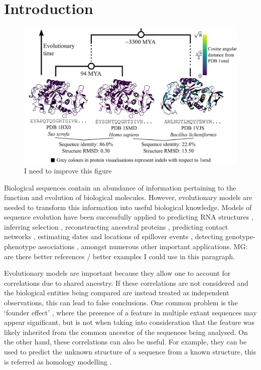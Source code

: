 \documentclass[nogrid]{MBE}%
\newcommand{\revcom}[1]{{\color{orange} #1}}
\begin{document}
\section{Introduction}
\begin{figure}
	\centering
	\includegraphics[width=1.75\columnwidth]{figures/divergence.pdf}
	\caption{\revcom{I need to improve this figure}}%
	\label{fig:divergence}%
\end{figure}

Biological sequences contain an abundance of information pertaining to the function and evolution of biological molecules. However, evolutionary models are needed to transform this information into useful biological knowledge. Models of sequence evolution have been successfully applied to predicting RNA structures \citep{sukosd2012ppfold}, inferring selection \citep{murrell2013fubar}, reconstructing ancestral proteins \citep{wilson2015using}, predicting contact networks \citep{giardina2017inference}, estimating dates and locations of spillover events \citep{dudas2018mers}, detecting genotype-phenotype associations \citep{escalera2018parallel}, amongst numerous other important applications. \revcom{MG: are there better references / better examples I could use in this paragraph}.

Evolutionary models are important because they allow one to account for correlations due to shared ancestry. If these correlations are not considered and the biological entities being compared are instead treated as independent observations, this can lead to false conclusions. One common problem is the `founder effect' \citep{bhattacharya2007founder}, where the presence of a feature in multiple extant sequences may appear significant, but is not when taking into consideration that the feature was likely inherited from the common ancestor of the sequences being analysed. On the other hand, these correlations can also be useful. For example, they can be used to predict the unknown structure of a sequence from a known structure, this is referred as homology modelling \citep{arnold2006swiss}.
\end{document}
